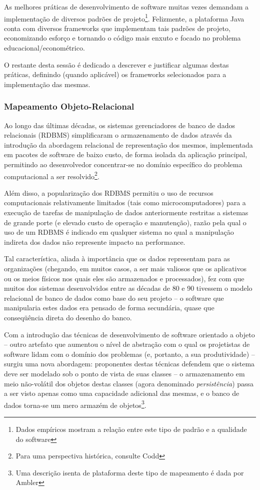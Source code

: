 \documentclass{abnt}
\begin{document}
As melhores práticas de desenvolvimento de software muitas vezes demandam a implementação de diversos padrões de projeto\footnote{Dados empíricos mostram\cite{IeeeExperience} a relação entre este tipo de padrão e a qualidade do software}. Felizmente, a plataforma Java conta com diversos frameworks que implementam tais padrões de projeto, economizando esforço e tornando o código mais enxuto e focado no problema educacional/econométrico.

O restante desta sessão é dedicado a descrever e justificar algumas destas práticas, definindo (quando aplicável) os frameworks selecionados para a implementação das mesmas.

\subsubsection{Mapeamento Objeto-Relacional}

Ao longo das últimas décadas, os sistemas gerenciadores de banco de dados relacionais (RDBMS)  simplificaram o armazenamento de dados através da introdução da abordagem relacional de representação dos mesmos, implementada em pacotes de software de baixo custo, de forma isolada da aplicação principal, permitindo ao desenvolvedor concentrar-se no domínio específico do problema computacional a ser resolvido\footnote{Para uma perspectiva histórica, consulte Codd\cite{Codd1970}}.

Além disso, a popularização dos RDBMS permitiu o uso de recursos computacionais relativamente limitados (tais como microcomputadores) para a execução de tarefas de manipulação de dados anteriormente restritas a sistemas de grande porte (e elevado custo de operação e manutenção), razão pela qual o uso de um RDBMS é indicado em qualquer sistema no qual a manipulação indireta dos dados não represente impacto na performance.

Tal característica, aliada à importância que os dados representam para as organizações (chegando, em muitos casos, a ser mais valiosos que os aplicativos ou os meios físicos nos quais eles são armazenados e processados), fez com que muitos dos sistemas desenvolvidos entre as décadas de 80 e 90 tivessem o modelo relacional de banco de dados como base do seu projeto – o software que manipularia estes dados era pensado de forma secundária, quase que conseqüência direta do desenho do banco.

Com a introdução das técnicas de desenvolvimento de software orientado a objeto – outro artefato que aumentou o nível de abstração com o qual os projetistas de software lidam com o domínio dos problemas (e, portanto, a sua produtividade) – surgiu uma nova abordagem: proponentes destas técnicas defendem que o sistema deve ser modelado sob o ponto de vista de suas classes – o armazenamento em meio não-volátil dos objetos destas classes (agora denominado \textit{persistência}) passa a ser visto apenas como uma capacidade adicional das mesmas, e o banco de dados torna-se um mero armazém de objetos\footnote{Uma descrição isenta de plataforma deste tipo de mapeamento é dada por Ambler\cite{web:ambler}}.
\end{document}
